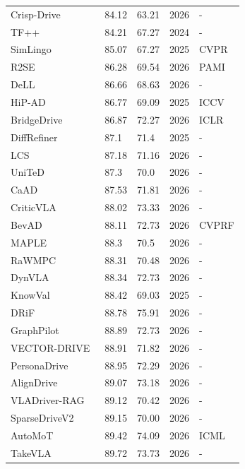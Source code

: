 \documentclass[10pt,twocolumn,letterpaper]{article}
\begin{document}
\begin{table}[t]
\begin{tabular}{l|ll|ll}
Crisp-Drive~\cite{Han2026ARXIV} & 84.12 & 63.21 & 2026 & - \\
TF++~\cite{Zimmerlin2024ArXiv} & 84.21 & 67.27 & 2024 & - \\
SimLingo~\cite{Renz2025CVPR} & 85.07 & 67.27 & 2025 & CVPR \\
R2SE~\cite{Liu2026PAMI} & 86.28 & 69.54 & 2026 & PAMI \\
DeLL~\cite{Du2026ARXIV} & 86.66 & 68.63 & 2026 & - \\
HiP-AD~\cite{Tang2025ICCV} & 86.77 & 69.09 & 2025 & ICCV \\
BridgeDrive~\cite{Liu2026ICLR} & 86.87 & 72.27 & 2026 & ICLR \\
DiffRefiner~\cite{Yin2025ARXIV} & 87.1 & 71.4 & 2025 & - \\
LCS~\cite{Hu2026ARXIV} & 87.18 & 71.16 & 2026 & - \\
UniTeD~\cite{Zhao2026ARXIVc} & 87.3 & 70.0 & 2026 & - \\
CaAD~\cite{Moon2026ARXIV} & 87.53 & 71.81 & 2026 & - \\
CriticVLA~\cite{Yang2026ARXIV} & 88.02 & 73.33 & 2026 & - \\
BevAD~\cite{Holtz2026CVPR} & 88.11 & 72.73 & 2026 & CVPRF \\
MAPLE~\cite{Yasarla2026ARXIV} & 88.3 & 70.5 & 2026 & - \\
RaWMPC~\cite{Sun2026ARXIV} & 88.31 & 70.48 & 2026 & - \\
DynVLA~\cite{Shang2026ARXIV} & 88.34 & 72.73 & 2026 & - \\
KnowVal~\cite{Xia2025ARXIV} & 88.42 & 69.03 & 2025 & - \\
DRiF~\cite{Tian2026ARXIV} & 88.78 & 75.91 & 2026 & - \\
GraphPilot~\cite{Schmidt2025ARXIV} & 88.89 & 72.73 & 2026 & - \\
VECTOR-DRIVE~\cite{Zhao2026ARXIVb} & 88.91 & 71.82 & 2026 & - \\
PersonaDrive~\cite{Srewa2026ARXIV} & 88.95 & 72.29 & 2026 & - \\
AlignDrive~\cite{Wu2026ARXIV} & 89.07 & 73.18 & 2026 & - \\
VLADriver-RAG~\cite{Zhao2026ARXIV} & 89.12 & 70.42 & 2026 & - \\
SparseDriveV2~\cite{Sun2026ARXIVb} & 89.15 & 70.00 & 2026 & - \\
AutoMoT~\cite{Huang2026ICML} & 89.42 & 74.09 & 2026 & ICML \\
TakeVLA~\cite{Gao2026ARXIV} & 89.72 & 73.73 & 2026 & - \\

\end{tabular}
\end{table}
\end{document}
